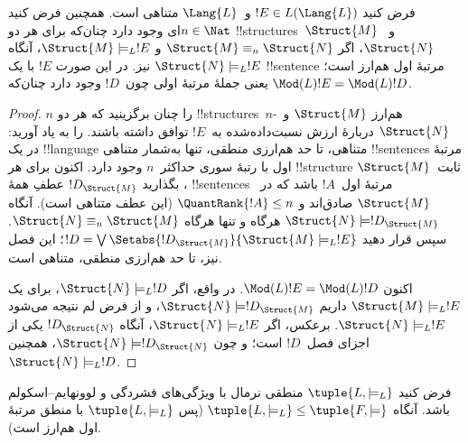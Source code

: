 \documentclass[../../../include/open-logic-section]{subfiles}
\begin{document}


\begin{lem}
فرض کنید $!E \in L(\Lang{L})$ و~$\Lang{L}$ متناهی است. همچنین فرض
کنید $n \in \Nat$ای وجود دارد چنان‌که برای هر دو
!!{structure}s~$\Struct{M}$ و~$\Struct{N}$، اگر
$\Struct{M} \equiv_n \Struct{N}$ و
$\Struct{M} \models_L !E$، آنگاه $\Struct{N} \models_L !E$ نیز.
در این صورت $!E$ با یک !!{sentence} مرتبهٔ اول هم‌ارز است؛ یعنی
جملهٔ مرتبهٔ اولی چون~$!D$ وجود دارد چنان‌که
$\Mod(L){!E} = \Mod(L){!D}$.
\end{lem}

\begin{proof}
$n$ را چنان برگزینید که هر دو !!{structure}s~$n$-هم‌ارز
$\Struct{M}$ و~$\Struct{N}$ دربارهٔ ارزش نسبت‌داده‌شده به~$!E$ توافق
داشته باشند.
 را به یاد آورید: در یک
!!{language} متناهی، تا حد هم‌ارزی منطقی، تنها به‌شمار متناهی
!!{sentence}s مرتبهٔ اول با رتبهٔ سوری حداکثر~$n$ وجود دارد. اکنون برای
هر !!{structure} ثابت~$\Struct{M}$، بگذارید $!D_{\Struct{M}}$ عطفِ
همهٔ !!{sentence}s مرتبهٔ اول~$!A$ باشد که در~$\Struct{M}$ صادق‌اند
و $\QuantRank{!A} \le n$ (این عطف متناهی است). آنگاه
$\Struct{N} \models !D_{\Struct{M}}$ هرگاه و تنها هرگاه
$\Struct{N} \equiv_n \Struct{M}$. سپس قرار دهید
$!D = \textstyle\bigvee
\Setabs{!D_{\Struct{M}}}{\Struct{M} \models_L !E}$؛ این فصل نیز، تا
حد هم‌ارزی منطقی، متناهی است.

اکنون $\Mod(L){!E} = \Mod(L){!D}$. در واقع، اگر
$\Struct{N} \models_L !D$، برای یک
$\Struct{M} \models_L !E$ داریم
$\Struct{N} \models !D_{\Struct{M}}$، و از فرض لم نتیجه می‌شود
$\Struct{N} \models_L !E$. برعکس، اگر
$\Struct{N} \models_L !E$، آنگاه
$!D_{\Struct{N}}$ یکی از اجزای فصل~$!D$ است؛ و چون
$\Struct{N} \models !D_{\Struct{N}}$، همچنین
$\Struct{N} \models_L !D$.
\end{proof}

\begin{thm}
   فرض کنید $\tuple{L, \models_L}$ منطقی نرمال
  با ویژگی‌های فشردگی و لوونهایم--اسکولم باشد. آنگاه
  $\tuple{L, \models_L} \le \tuple{F, \models}$ (پس
  $\tuple{L, \models_L}$ با منطق مرتبهٔ اول هم‌ارز است).
\end{thm}
\end{document}
